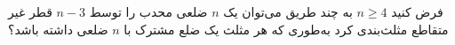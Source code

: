     \p 
فرض کنید
$n \geq 4$
به چند طریق می‌توان یک
$n$
ضلعی محدب را توسط
$n - 3$
قطر غیر متقاطع مثلث‌بندی کرد به‌طوری که هر مثلث یک ضلع مشترک با
$n$
ضلعی داشته باشد؟